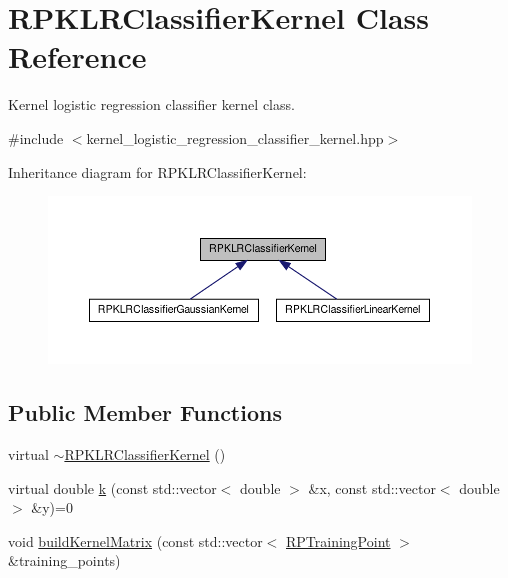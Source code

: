 \hypertarget{class_r_p_k_l_r_classifier_kernel}{\section{\-R\-P\-K\-L\-R\-Classifier\-Kernel \-Class \-Reference}
\label{class_r_p_k_l_r_classifier_kernel}
}


\-Kernel logistic regression classifier kernel class.  




{\ttfamily \#include $<$kernel\-\_\-logistic\-\_\-regression\-\_\-classifier\-\_\-kernel.\-hpp$>$}



\-Inheritance diagram for \-R\-P\-K\-L\-R\-Classifier\-Kernel\-:\nopagebreak
\begin{figure}[H]
\begin{center}
\leavevmode
\includegraphics[width=350pt]{class_r_p_k_l_r_classifier_kernel__inherit__graph}
\end{center}
\end{figure}
\subsection*{\-Public \-Member \-Functions}
\begin{DoxyCompactItemize}
\item 
virtual \hyperlink{class_r_p_k_l_r_classifier_kernel_aae696fbcc7a2f9120192ba643c269da9}{$\sim$\-R\-P\-K\-L\-R\-Classifier\-Kernel} ()
\item 
virtual double \hyperlink{class_r_p_k_l_r_classifier_kernel_a39824eec9f922dc01f151632b2f05649}{k} (const std\-::vector$<$ double $>$ \&x, const std\-::vector$<$ double $>$ \&y)=0
\item 
void \hyperlink{class_r_p_k_l_r_classifier_kernel_a31c6e4fca7dcec2829cdfa17d4cd28d2}{build\-Kernel\-Matrix} (const std\-::vector$<$ \hyperlink{struct_r_p_training_point}{\-R\-P\-Training\-Point} $>$ \&training\-\_\-points)
\end{DoxyCompactItemize}
